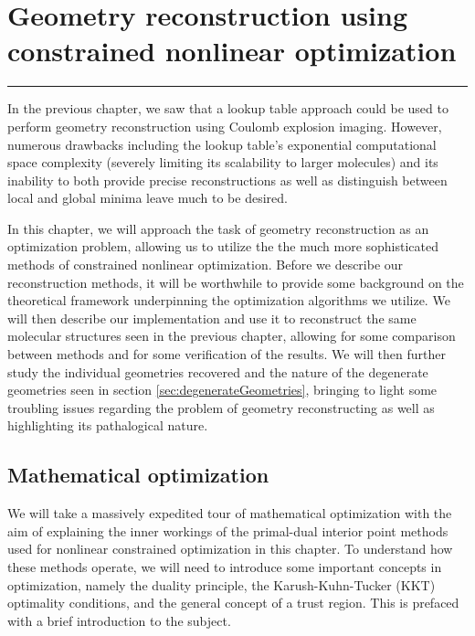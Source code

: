 \chapter{Geometry reconstruction using constrained nonlinear optimization}\label{ch:optimization}

\vspace{-1.5 em}
\begin{addmargin}[-0.5cm]{0cm}
  \minitoc
\end{addmargin}
\hrule
\vspace{1.5 em}

In the previous chapter, we saw that a lookup table approach could be used to perform geometry reconstruction using Coulomb explosion imaging. However, numerous drawbacks including the lookup table's exponential computational space complexity (severely limiting its scalability to larger molecules) and its inability to both provide precise reconstructions as well as distinguish between local and global minima leave much to be desired.

In this chapter, we will approach the task of geometry reconstruction as an optimization problem, allowing us to utilize the the much more sophisticated methods of constrained nonlinear optimization. Before we describe our reconstruction methods, it will be worthwhile to provide some background on the theoretical framework underpinning the optimization algorithms we utilize. We will then describe our implementation and use it to reconstruct the same molecular structures seen in the previous chapter, allowing for some comparison between methods and for some verification of the results. We will then further study the individual geometries recovered and the nature of the degenerate geometries seen in section \ref{sec:degenerateGeometries}, bringing to light some troubling issues regarding the problem of geometry reconstructing as well as highlighting its pathalogical nature.

\section{Mathematical optimization}
We will take a massively expedited tour of mathematical optimization with the aim of explaining the inner workings of the primal-dual interior point methods used for nonlinear constrained optimization in this chapter. To understand how these methods operate, we will need to introduce some important concepts in optimization, namely the duality principle, the Karush-Kuhn-Tucker (KKT) optimality conditions, and the general concept of a trust region. This is prefaced with a brief introduction to the subject.

